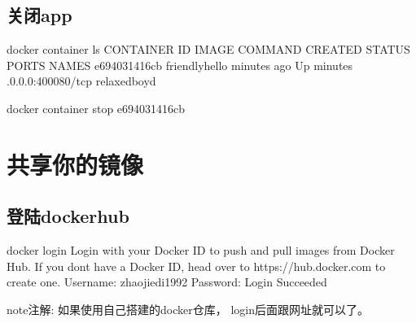 \documentclass[letterpaper,10pt,english]{sphinxmanual}
\begin{document}
\subsection{关闭app}
\label{\detokenize{_u5feb_u901f_u5165_u95e8/02-_u5bb9_u5668:id6}}
%
\begin{sphinxVerbatim}[commandchars=\\\{\}]
docker container ls
    CONTAINER ID        IMAGE               COMMAND             CREATED             STATUS              PORTS                  NAMES
    e694031416cb        friendlyhello             minutes ago       Up  minutes        .0.0.0:4000\PYGZhy{}\PYGZgt{}80/tcp   relaxed\PYGZus{}boyd

docker container stop e694031416cb
\end{sphinxVerbatim}


\section{共享你的镜像}
\label{\detokenize{_u5feb_u901f_u5165_u95e8/02-_u5bb9_u5668:id7}}

\subsection{登陆dockerhub}
\label{\detokenize{_u5feb_u901f_u5165_u95e8/02-_u5bb9_u5668:dockerhub}}
%
\begin{sphinxVerbatim}[commandchars=\\\{\}]
\PYGZdl{} docker login
Login with your Docker ID to push and pull images from Docker Hub. If you don\PYGZsq{}t have a Docker ID, head over to https://hub.docker.com to create one.
Username: zhaojiedi1992
Password:
Login Succeeded
\end{sphinxVerbatim}

\begin{sphinxadmonition}{note}{注解:}
如果使用自己搭建的docker仓库， login后面跟网址就可以了。
\end{sphinxadmonition}
\end{document}
